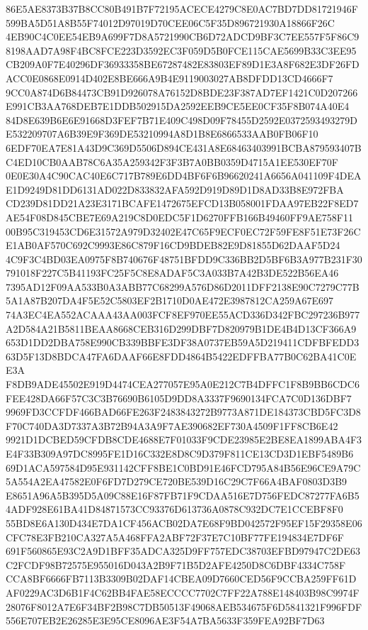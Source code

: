 \documentclass[UTF8,fontset=fandol,zihao=-4,a4paper]{ctexart}
\begin{document}
{{86E5AE8373B37B8CC80B491B7F72195ACECE4279C8E0AC7BD7DD81721946F599BA5D51A8B55F74012D97019D70CEE06C5F35D896721930A18866F26C
4EB90C4C0EE54EB9A699F7D8A5721990CB6D72ADCD9BF3C7EE557F5F86C98198AAD7A98F4BC8FCE223D3592EC3F059D5B0FCE115CAE5699B33C3EE95
CB209A0F7E40296DF36933358BE67287482E83803EF89D1E3A8F682E3DF26FDACC0E0868E0914D402E8BE666A9B4E9119003027AB8DFDD13CD4666F7
9CC0A874D6B84473CB91D926078A76152D8BDE23F387AD7EF1421C0D207266E991CB3AA768DEB7E1DDB502915DA2592EEB9CE5EE0CF35F8B074A40E4
84D8E639B6E6E91668D3FEF7B71E409C498D09F78455D2592E0372593493279DE532209707A6B39E9F369DE53210994A8D1B8E6866533AAB0FB06F10
6EDF70EA7E81A43D9C369D5506D894CE431A8E68463403991BCBA879593407BC4ED10CB0AAB78C6A35A259342F3F3B7A0BB0359D4715A1EE530EF70F
0E0E30A4C90CAC40E6C717B789E6DD4BF6F6B96620241A6656A041109F4DEAE1D9249D81DD6131AD022D833832AFA592D919D89D1D8AD33B8E972FBA
CD239D81DD21A23E3171BCAFE1472675EFCD13B058001FDAA97EB22F8ED7AE54F08D845CBE7E69A219C8D0EDC5F1D6270FFB166B49460FF9AE758F11
00B95C319453CD6E31572A979D32402E47C65F9ECF0EC72F59FE8F51E73F26CE1AB0AF570C692C9993E86C879F16CD9BDEB82E9D81855D62DAAF5D24
4C9F3C4BD03EA0975F8B740676F48751BFDD9C336BB2D5BF6B3A977B231F30791018F227C5B41193FC25F5C8E8ADAF5C3A033B7A42B3DE522B56EA46
7395AD12F09AA533B0A3ABB77C68299A576D86D2011DFF2138E90C7279C77B5A1A87B207DA4F5E52C5803EF2B1710D0AE472E3987812CA259A67E697
74A3EC4EA552ACAAA43AA003FCF8EF970EE55ACD336D342FBC297236B977A2D584A21B5811BEAA8668CEB316D299DBF7D820979B1DE4B4D13CF366A9
653D1DD2DBA758E990CB339BBFE3DF38A0737EB59A5D219411CDFBFEDD363D5F13D8BDCA47FA6DAAF66E8FDD4864B5422EDFFBA77B0C62BA41C0EE3A
F8DB9ADE45502E919D4474CEA277057E95A0E212C7B4DFFC1F8B9BB6CDC6FEE428DA66F57C3C3B76690B6105D9DD8A3337F9690134FCA7C0D136DBF7
9969FD3CCFDF466BAD66FE263F2483843272B9773A871DE184373CBD5FC3D8F70C740DA3D7337A3B72B94A3A9F7AE390682EF730A4509F1FF8CB6E42
9921D1DCBED59CFDB8CDE4688E7F01033F9CDE23985E2BE8EA1899ABA4F3E4F33B309A97DC8995FE1D16C332E8D8C9D379F811CE13CD3D1EBF5489B6
69D1ACA597584D95E931142CFF8BE1C0BD91E46FCD795A84B56E96CE9A79C5A554A2EA47582E0F6FD7D279CE720BE539D16C29C7F66A4BAF0803D3B9
E8651A96A5B395D5A09C88E16F87FB71F9CDAA516E7D756FEDC87277FA6B54ADF928E61BA41D84871573CC93376D613736A0878C932DC7E1CCEBF8F0
55BD8E6A130D434E7DA1CF456ACB02DA7E68F9BD042572F95EF15F29358E06CFC78E3FB210CA327A5A468FFA2ABF72F37E7C10BF77FE194834E7DF6F
691F560865E93C2A9D1BFF35ADCA325D9FF757EDC38703EFBD97947C2DE63C2FCDF98B72575E955016D043A2B9F71B5D2AFE4250D8C6DBF4334C758F
CCA8BF6666FB7113B3309B02DAF14CBEA09D7660CED56F9CCBA259FF61DAF0229AC3D6B1F4C62BB4FAE58ECCCC7702C7FF22A788E148403B98C9974F
28076F8012A7E6F34BF2B98C7DB50513F49068AEB534675F6D5841321F996FDF556E707EB2E26285E3E95CE8096AE3F54A7BA5633F359FEA92BF7D63
}}
\end{document}
